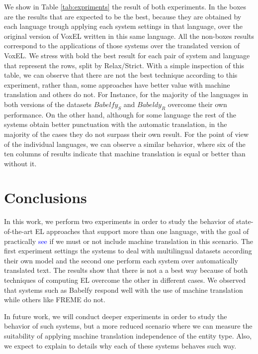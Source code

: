 \documentclass{llncs}
\begin{document}
We show in Table \ref{tab:expriments} the result of both experiments. In the boxes are the results that are expected to be the best, because they are obtained by each language trough applying each system settings in that language, over the original version of VoxEL written in this same language. All the non-boxes results correspond to the applications of those systems over the translated version of VoxEL. We stress with bold the best result for each pair of system and language that represent the rows, split by Relax/Strict. With a simple inspection of this table, we can observe that there are not the best technique according to this experiment, rather than, some approaches have better value with machine translation and others do not. For Instance, for the majority of the languages in both versions of the datasets $Babelfy_S$ and $Babeldy_R$ overcome their own performance. On the other hand, although for some language the rest of the systems obtain better punctuation with the automatic translation, in the majority of the cases they do not surpass their own result. For the point of view of the individual languages, we can observe a similar behavior, where six of the ten columns of results indicate that machine translation is equal or better than without it.  


\section{Conclusions}

In this work, we perform two experiments in order to study the behavior of state-of-the-art EL approaches that support more than one language, with the goal of practically \textcolor{blue}{see} if we must or not include machine translation in this scenario. The first experiment settings the systems to deal with multilingual datasets according their own model and the second one perform each system over automatically translated text. The results show that there is not a a best way because of both techniques of computing EL overcome the other in different cases. We observed that systems such as Babelfy respond well with the use of machine translation while others like FREME do not.

In future work, we will conduct deeper experiments in order to study the behavior of such systems, but a more reduced scenario where we can measure the suitability of applying machine translation independence of the entity type. Also, we expect to explain to details why each of these systems behaves such way.
\end{document}
